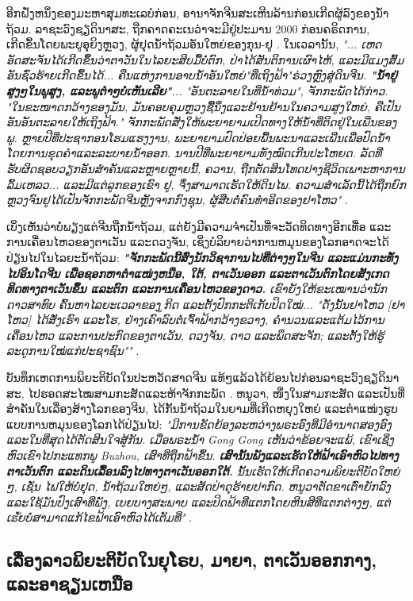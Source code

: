 \documentclass[10pt,twocolumn,letterpaper]{article}
\begin{document}
ອີກຝັ່ງຫນຶ່ງຂອງມະຫາສຸມທະເລບໍກ່ອນ, ອານາຈັກຈີນສະເຫີນລ້ານກ່ອນເກີດຜູ້ລົງຂອງນໍ້າຖ້ວມ. ລາຊະວົງຊຽດິນາສະ, ຖືກຄາດຄະເນວ່າຈະມີຢູ່ປະມານ 2000 ກ່ອນຄຣິດການ, ເກີດຂຶ້ນໂດຍພະຍູອຸຍິງຫຼວງ, ຜູ້ຢຸດນໍ້າຖ້ວມອັນໃຫຍ່ຂອງກຸນ-ຢູ \cite{6}. ໃນເວລານັ້ນ, \textit{"... ເຫດອັດສະຈັນໄດ້ເກີດຂຶ້ນວ່າຕາວັນໃນໄລຍະສິບມື້ບໍ່ຕົກ, ປ່າໄດ້ສັນຕິການເຜົາໄຫ້, ແລະມີແມງສົ້ມອັນຊົ່ວຮ້າຍເກີດຂຶ້ນໄດ້... ຄືນແຫ່ງການອາບນໍ້າອັນໃຫຍ່"ທີ່ເຖິງຟ້າ"ຣ່ວງຫຼົງສູ່ດິນຈີນ. \textbf{"ນໍ້າຢູ່ສູງໆໃນພູສູງ, ແລະພູຕໍາໆບໍ່ເຫັນເລີຍ"}... "ອັນຕະລາຍໃນທີ່ນໍ້າທ່ວມ", ຈັກກະພັດໄດ້ກ່າວ. "ໃນຂະໜາດກວ້າງຂອງມັນ, ມັນຄອບຄຸມຫຼວງຊື້ນຶ່ງແລະຢ້ານຢ້ານໃນຄວາມສູງໃຫຍ່, ຄືເປັນອັນອັນຕະລາຍໃຫ້ເຖິງຟ້າ." ຈັກກະພັດສັ່ງໃຫ້ພະຍາຍາມເປີດທາງໃຫ້ນໍ້າທີ່ຕິດຢູ່ໃນເພີ່ນຂອງພູ. ຫຼາຍປີທີ່ປະຊາກອນໂຮມແຮງງານ, ພະຍາຍາມປົດປ່ອຍພື້ນພະນາແລະເພີ່ນເພື່ອປົດນໍ້າໂດຍການຂຸດຄໍາແລະລະບາຍນໍ້າອອກ. ນານປີທີ່ພະຍາຍາມທັງໝົດເກີນປະໂຫຍດ. ລັດທີ່ຮັບຜິດຊອບວຽກອັນສໍາຄັນແລະຫຼາຍຫຼາຍນີ້, ຄວານ, ຖືກຕັດສິນໂທດປາງຊີວິດເພາະຫາການລົ້ມເຫລວ... ແລະມີແຕ່ລູກຂອງເຂົາ ຢູ, ຈຶ່ງສາມາດເຮັດໃຫ້ດິນໄພ. ຄວາມສໍາເລັດນີ້ໄດ້ຖືກຍົກຫຼວງຈົນຢູໄດ້ເປັນຈັກກະພັດຈີນຫຼັງຈາກກົງຊຸນ, ຜູ້ສືບຕໍ່ຄົນທຳອິດຂອງຢາໂຫວ"} \cite{5}.

ເບິ່ງເຫັນວ່າບໍ່ພຽງແຕ່ຈີນຖືກນໍ້າຖ້ວມ, ແຕ່ຍັງມີຄວາມຈໍາເປັນທີ່ຈະວັດທິດທາງອີກເທື່ອ ແລະການເຄື່ອນໄຫວຂອງຕາເວັນ ແລະດວງຈັນ, ເຊິ່ງບໍລິບາຍວ່າການຫມຸນຂອງໂລກອາດຈະໄດ້ປ່ຽນໄປໃນໄລຍະນໍ້າຖ້ວມ: \textit{\textbf{"ຈັກກະພັດນີ້ສົ່ງນັກວິຊາການໄປທີ່ຕ່າງໆໃນຈີນ ແລະແມ່ນກະທັ່ງໄປອິນໂດຈີນ ເພື່ອຊອກຫາຕຳແໜ່ງຫນືອ, ໃຕ້, ຕາເວັນອອກ ແລະຕາເວັນຕົກໂດຍສັງເກດທິດທາງຕາເວັນຂຶ້ນ ແລະຕົກ ແລະການເຄື່ອນໄຫວຂອງດາວ.} ເຂົາຍັງໃຫ້ຂະເໝານວ່ານັກດາວສາທົບ ຄົ້ນຫາໄລຍະເວລາຂອງ຤ູກິດ ແລະຕັ້ງປົກກະຕິເກັບປິດໃໝ່... "ດັ່ງນັ້ນຢາໂຫວ [ຢາໂຫວ] ໄດ້ສັ່ງເຮົາ ແລະໂຮ, ຢ່າງເຄົາລົບຕໍ່ເຈົ້າຟ້າກວ້າງຂວາງ, ຄໍານວນແລະແຕ້ມໄວ້ການເຄື່ອນໄຫວ ແລະການປະກົດຂອງຕາເວັນ, ດວງຈັນ, ດາວ ແລະພຶດສະຈັກ; ແລະຕັ້ງໃຫ້ຮູ້ລະດູການໃໝ່ແກ່ປະຊາຊົນ""} \cite{5}.

ບັນທຶກເຫດການພິຍະຕິບັດໃນປະຫວັດສາດຈີນ ແທ້ໆແລ້ວໄດ້ຍ້ອນໄປກ່ອນລາຊະວົງຊຽດິນາສະ, ໄປຮອດສະໄໝສາມກະສັດແລະຫ້າຈັກກະພັດ \cite{7}. ຫນູວາ, ໜຶ່ງໃນສາມກະສັດ ແລະເປັນທີ່ສຳຄັນໃນເລື່ອງສ້າງໂລກຂອງຈີນ, ໄດ້ກັ້ນນໍ້າຖ້ວມໃນຍາມທີ່ເກີດຫຍຸງໃຫຍ່ ແລະຕຳແໜ່ງຮູບແບບການຫມຸນຂອງໂລກໄດ້ປ່ຽນໄປ: \textit{"ມີການຂັດຍ້ອງລະຫວ່າງພຣະອົງທີ່ມີອຳນາດສອງອົງ ແລະໃນທີ່ສຸດໄດ້ຕັດສິນໃຈສູ້ກັນ. ເມື່ອພຣະນໍ້າ Gong Gong ເຫັນວ່າຂ້ອຍຈະແພ້, ເຂົາເຊິ່ງຫົວເຂົາໄປກະແທກພູ Buzhou, ເສົາທີ່ຖືກຟ້າຂຶ້ນ. \textbf{ເສົານັ້ນພັງແລະເຮັດໃຫ້ຟ້າເອົາຫົວໄປທາງຕາເວັນຕົກ ແລະດິນເລື້ອນລົງໄປທາງຕາເວັນອອກໃຕ້.} ນັ້ນເຮັດໃຫ້ເກີດຄວາມພິຍະຕິບັດໃຫຍ່ໆ, ເຊັ່ນ ໄຟໃຫ້ບໍ່ຢຸດ, ນໍ້າຖ້ວມໃຫຍ່ໆ, ແລະສັດປ່າດຸຮ້າຍປາກົດ. ຫນູວາຕັດຂາເຕົ່າຍັກລົງແລະໃຊ້ມັນປົງເສົາທີ່ພັງ, ເບຍບາງສະພາບ ແລະປິດຟ້າທີ່ແຕກໂດຍຫີນສີທີ່ແຕກຕ່າງໆ, ແຕ່ເຘັ້ຍບໍ່ສາມາດແກ້ໄຂຟ້າເອົາຫົວໄດ້ເຕັມທີ່"} \cite{8}.

\subsection{ເລື່ອງລາວພິຍະຕິບັດໃນຍຸໂຣບ, ມາຍາ, ຕາເວັນອອກກາງ, ແລະອາຊຽນເຫນືອ}
\end{document}
